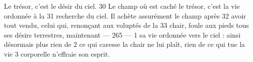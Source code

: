 Le trésor, c'est le désir du ciel.	 
30	 	Le champ où est caché le trésor, c'est la vie ordonnée à la	 
31	 	recherche du ciel. Il achète assurément le champ après	 
32	 	avoir tout vendu, celui qui, renonçant aux voluptés de la	 
33	 	chair, foule aux pieds tous ses désirs terrestres, maintenant	 
 	--- 265 ---	 
1	 	sa vie ordonnée vers le ciel : ainsi désormais plus rien de	 
2	 	ce qui caresse la chair ne lui plaît, rien de ce qui tue la vie	 
3	 	corporelle n'effraie son esprit.